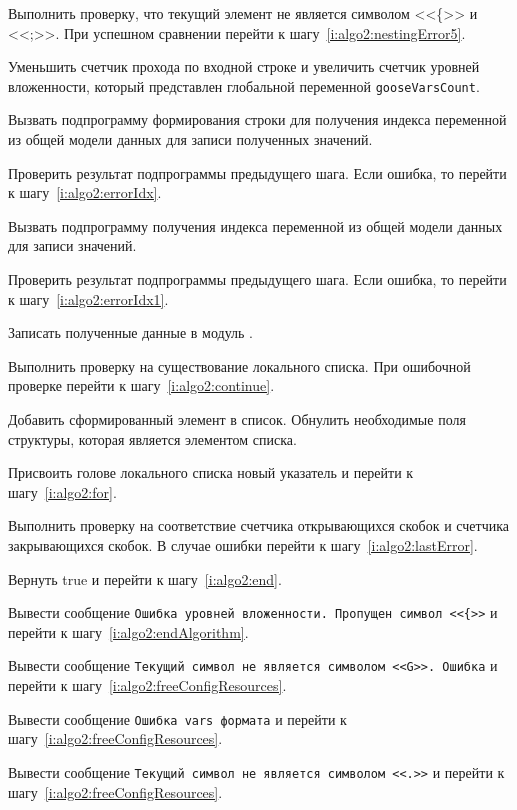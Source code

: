 \begin{enumerate_step}
    \item \label{i:algo2:AddLastSymbol6} Выполнить проверку, что текущий элемент не является символом <<\{>> и
    <<;>>. При успешном сравнении перейти к шагу~\ref{i:algo2:nestingError5}.
    \item Уменьшить счетчик прохода по входной строке и увеличить счетчик уровней вложенности, который представлен глобальной переменной \lstinline{gooseVarsCount}.
    \item Вызвать подпрограмму формирования строки для получения индекса переменной из общей модели данных для записи полученных значений.
    \item Проверить результат подпрограммы предыдущего шага. Если ошибка, то перейти к шагу~\ref{i:algo2:errorIdx}.
    \item Вызвать подпрограмму получения индекса переменной из общей модели данных для записи значений.
    \item Проверить результат подпрограммы предыдущего шага. Если ошибка, то перейти к шагу~\ref{i:algo2:errorIdx1}.
    \item Записать полученные данные в модуль \moduleDataStoring.
    \item Выполнить проверку на существование локального списка. При ошибочной проверке перейти к шагу~\ref{i:algo2:continue}.
    \item Добавить сформированный элемент в список. Обнулить необходимые поля структуры, которая является элементом списка.
    \item \label{i:algo2:continue} Присвоить голове локального списка новый указатель и перейти к шагу~\ref{i:algo2:for}.
    \item \label{i:algo2:lastOper} Выполнить проверку на соответствие счетчика открывающихся скобок и счетчика закрывающихся скобок. В случае ошибки перейти к шагу~\ref{i:algo2:lastError}.
    \item Вернуть true и перейти к шагу~\ref{i:algo2:end}.
    \item \label{i:algo2:nestingError} Вывести сообщение \texttt{Ошибка уровней вложенности. Пропущен символ <<\{>>} и перейти к шагу~\ref{i:algo2:endAlgorithm}.
    \item \label{i:algo2:notG} Вывести сообщение \texttt{Текущий символ не является символом <<G>>. Ошибка} и перейти к шагу~\ref{i:algo2:freeConfigResources}.
    \item \label{i:algo2:errorVarsFormat} Вывести сообщение \texttt{Ошибка vars формата} и перейти к шагу~\ref{i:algo2:freeConfigResources}.
    \item \label{i:algo2:notCorrectSymbol} Вывести сообщение \texttt{Текущий символ не является символом <<.>>} и перейти к шагу~\ref{i:algo2:freeConfigResources}.

\end{enumerate_step}
